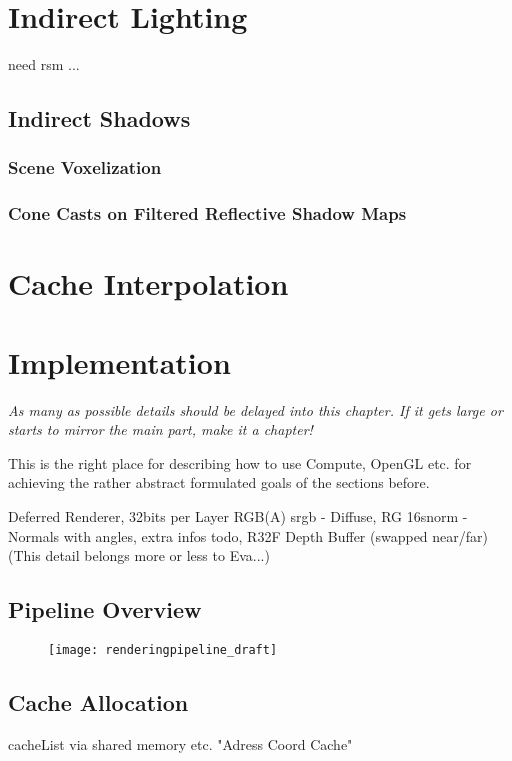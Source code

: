 \documentclass[thesis.tex]{subfiles}
\begin{document}
\section{Indirect Lighting}

need rsm ... 

\subsection{Indirect Shadows}

\subsubsection{Scene Voxelization}

\subsubsection{Cone Casts on Filtered Reflective Shadow Maps}


\section{Cache Interpolation}



\section{Implementation}

\emph{As many as possible details should be delayed into this chapter. If it gets large or starts to mirror the main part, make it a chapter!}

This is the right place for describing how to use Compute, OpenGL etc. for achieving the rather abstract formulated goals of the sections before.

Deferred Renderer, 32bits per Layer RGB(A) srgb - Diffuse, RG 16snorm - Normals with angles, extra infos todo, R32F Depth Buffer (swapped near/far)\\
(This detail belongs more or less to Eva...)

\subsection{Pipeline Overview}

\begin{figure}[h]
	\centering
	\texttt{[image: renderingpipeline\_draft]}
\end{figure}



\subsection{Cache Allocation}
cacheList via shared memory etc.
"Adress Coord Cache"

\subfilebib %
\end{document}
